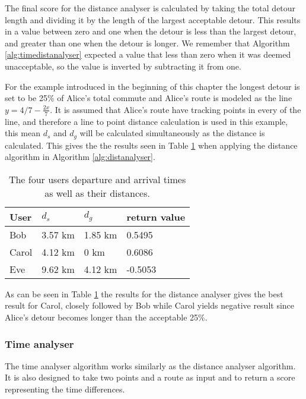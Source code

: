 The final score for the distance analyser is calculated by taking the total detour length and dividing it by the length of the largest acceptable detour.
This results in a value between zero and one when the detour is less than the largest detour, and greater than one when the detour is longer.
We remember that Algorithm \ref{alg:timedistanalyser} expected a value that less than zero when it was deemed unacceptable, so the value is inverted by subtracting it from one.

For the example introduced in the beginning of this chapter the longest detour is set to be 25\% of Alice's total commute and Alice's route is modeled  as the line  $y = 4/7-\frac{2 x}{7}$.
It is assumed that Alice's route have tracking points in every of the line, and therefore a line to point distance calculation is used in this example, this mean $d_s$ and $d_g$ will be calculated simultaneously as the distance is calculated.
This gives the the results seen in Table \ref{tbl:distance} when applying the distance algorithm in Algorithm \ref{alg:distanalyser}.

\begin{table}[!ht]
\centering
\begin{tabular}{@{}llll@{}}
\toprule
\textbf{User} 	& \textbf{$d_s$} & \textbf{$d_g$} 	& \textbf{return value} 	\\ \midrule
Bob         	& 3.57 km        & 1.85 km	    	& 0.5495 			\\
Carol         	& 4.12 km        & 0 km       		& 0.6086        		\\
Eve           	& 9.62 km        & 4.12 km		    & -0.5053        		\\ \bottomrule
\end{tabular}
\caption{The four users departure and arrival times as well as their distances.}
\label{tbl:distance}
\end{table}

As can be seen in Table \ref{tbl:distance} the results for the distance analyser gives the best result for Carol, closely followed by Bob while Carol yields negative result since Alice's detour becomes longer than the acceptable 25\%. 



\subsubsection{Time analyser}
The time analyser algorithm works similarly as the distance analyser algorithm. 
It is also designed to take two points and a route as input and to return a score representing the time differences.

